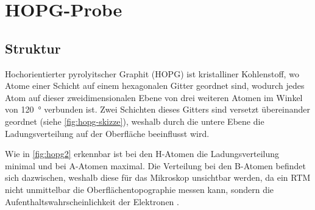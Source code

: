 \section{HOPG-Probe}\label{sec:hopg-probe}
\subsection*{Struktur}
Hochorientierter pyrolyitscher Graphit (HOPG) ist kristalliner Kohlenstoff, wo Atome einer Schicht
auf einem hexagonalen Gitter geordnet sind, wodurch jedes Atom auf dieser zweidimensionalen
Ebene von drei weiteren Atomen im Winkel von \SI{120}{\degree} verbunden ist. Zwei Schichten
dieses Gitters sind versetzt übereinander geordnet (siehe \cref{fig:hopg-skizze}), weshalb durch die
untere Ebene die Ladungsverteilung auf der Oberfläche beeinflusst wird.\par Wie in
\cref{fig:hopg2} erkennbar ist bei den H-Atomen die Ladungsverteilung minimal und bei A-Atomen maximal.
Die Verteilung bei den B-Atomen befindet sich dazwischen, weshalb diese für das Mikroskop unsichtbar werden,
da ein RTM nicht unmittelbar die Oberflächentopographie messen kann, sondern die Aufenthaltswahrscheinlichkeit der
Elektronen \cite[Kap.1 S.7]{rtm-leitpfaden}.

